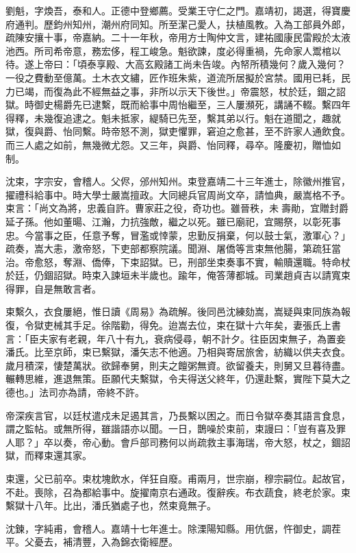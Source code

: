 \begin{pinyinscope}
{{劉魁，字煥吾，泰和人。正德中登鄉薦。受業王守仁之門。嘉靖初，謁選，得寶慶府通判。歷鈞州知州，潮州府同知。所至潔己愛人，扶植風教。入為工部員外郎，疏陳安攘十事，帝嘉納。二十一年秋，帝用方士陶仲文言，建祐國康民雷殿於太液池西。所司希帝意，務宏侈，程工峻急。魁欲諫，度必得重禍，先命家人鬻棺以待。遂上帝曰：「頃泰享殿、大高玄殿諸工尚未告竣。內帑所積幾何？歲入幾何？一役之費動至億萬。土木衣文繡，匠作班朱紫，道流所居擬於宮禁。國用已耗，民力已竭，而復為此不經無益之事，非所以示天下後世。」帝震怒，杖於廷，錮之詔獄。時御史楊爵先已逮繫，既而給事中周怡繼至，三人屢瀕死，講誦不輟。繫四年得釋，未幾復追逮之。魁未抵家，緹騎已先至，繫其弟以行。魁在道聞之，趣就獄，復與爵、怡同繫。時帝怒不測，獄吏懼罪，窘迫之愈甚，至不許家人通飲食。而三人處之如前，無幾微尤怨。又三年，與爵、怡同釋，尋卒。隆慶初，贈恤如制。

沈束，字宗安，會稽人。父侭，邠州知州。束登嘉靖二十三年進士，除徽州推官，擢禮科給事中。時大學士嚴嵩擅政。大同總兵官周尚文卒，請恤典，嚴嵩格不予。束言：「尚文為將，忠義自許。曹家莊之役，奇功也。雖晉秩，未壽勛，宜贈封爵延子孫。他如董暘、江瀚，力抗強敵，繼之以死。雖已廟祀，宜賜祭，以彰死事忠。今當事之臣，任意予奪，冒濫或悻蒙，忠勤反捐棄，何以鼓士氣，激軍心？」疏奏，嵩大恚，激帝怒，下吏部都察院議。聞淵、屠僑等言束無他腸，第疏狂當治。帝愈怒，奪淵、僑俸，下束詔獄。已，刑部坐束奏事不實，輸贖還職。特命杖於廷，仍錮詔獄。時束入諫垣未半歲也。踰年，俺答薄都城。司業趙貞吉以請寬束得罪，自是無敢言者。

束繫久，衣食屢絕，惟日讀《周易》為疏解。後同邑沈練劾嵩，嵩疑與束同族為報復，令獄吏械其手足。徐階勸，得免。迨嵩去位，束在獄十六年矣，妻張氏上書言：「臣夫家有老親，年八十有九，衰病侵尋，朝不計夕。往臣因束無子，為置妾潘氏。比至京師，束已繫獄，潘矢志不他適。乃相與寄居旅舍，紡織以供夫衣食。歲月積深，悽楚萬狀。欲歸奉舅，則夫之饘粥無資。欲留養夫，則舅又旦暮待盡。輾轉思維，進退無策。臣願代夫繫獄，令夫得送父終年，仍還赴繫，實陛下莫大之德也。」法司亦為請，帝終不許。

帝深疾言官，以廷杖遣戍未足遏其言，乃長繫以困之。而日令獄卒奏其語言食息，謂之監帖。或無所得，雖諧語亦以聞。一日，鵲噪於束前，束謾曰：「豈有喜及罪人耶？」卒以奏，帝心動。會戶部司務何以尚疏救主事海瑞，帝大怒，杖之，錮詔獄，而釋束還其家。

束還，父已前卒。束枕塊飲水，佯狂自廢。甫兩月，世宗崩，穆宗嗣位。起故官，不赴。喪除，召為都給事中。旋擢南京右通政。復辭疾。布衣蔬食，終老於家。束繫獄十八年。比出，潘氏猶處子也，然束竟無子。

沈鍊，字純甫，會稽人。嘉靖十七年進士。除溧陽知縣。用伉倨，忤御史，調茬平。父憂去，補清豐，入為錦衣衛經歷。

}}
\end{pinyinscope}
